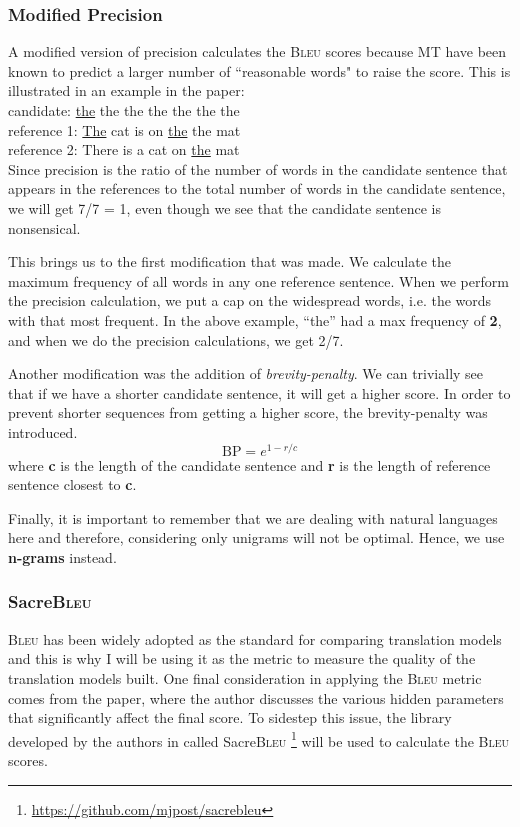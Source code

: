 \documentclass[12pt,a4paper,twoside,openright]{report}
\newcommand{\bleu}{\textsc{Bleu} }
\newcommand{\changedFont}[1]{{\fontfamily{qcr}\selectfont #1}}
\begin{document}
\subsubsection{Modified Precision}
A modified version of precision calculates the \bleu scores because MT have been known to predict a larger number of ``reasonable words" to raise the score. This is illustrated in an example in the paper\cite{bleu}: \\
candidate: \changedFont{\underline{the} the the the the the the}\\
reference 1: \changedFont{\underline{The} cat is on \underline{the} the mat}\\
reference 2: \changedFont{There is a cat on \underline{the} mat}\\
Since precision is the ratio of the number of words in the candidate sentence that appears in the references to the total number of words in the candidate sentence, we will get 7/7 = 1, even though we see that the candidate sentence is nonsensical.

This brings us to the first modification that was made. We calculate the maximum frequency of all words in any one reference sentence. When we perform the precision calculation, we put a cap on the widespread words, i.e. the words with that most frequent. In the above example, ``\changedFont{the}'' had a max frequency of \textbf{2}, and when we do the precision calculations, we get 2/7.

Another modification was the addition of \textit{brevity-penalty}. We can trivially see that if we have a shorter candidate sentence, it will get a higher score. In order to prevent shorter sequences from getting a higher score, the brevity-penalty was introduced.
\[ \text{BP} = e^{1-r/c}\]
where \textbf{c} is the length of the candidate sentence and \textbf{r} is the length of reference sentence closest to \textbf{c}.

Finally, it is important to remember that we are dealing with natural languages here and therefore, considering only unigrams will not be optimal. Hence, we use \textbf{n-grams} instead.

\subsubsection{Sacre\bleu}
\bleu has been widely adopted as the standard for comparing translation models and this is why I will be using it as the metric to measure the quality of the translation models built. One final consideration in applying the \bleu metric comes from the paper\cite{sacrebleu}, where the author discusses the various hidden parameters that significantly affect the final score. To sidestep this issue, the library developed by the authors in\cite{sacrebleu} called Sacre\bleu\footnote{\url{https://github.com/mjpost/sacrebleu}} will be used to calculate the \bleu scores.
\end{document}
